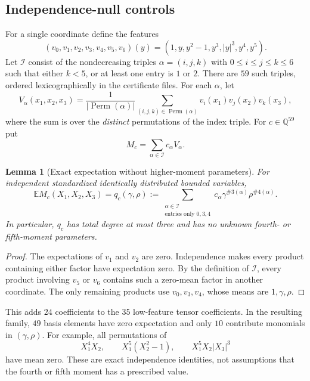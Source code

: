 \documentclass[11pt,a4paper]{article}
\numberwithin{equation}{section}
\newtheorem{lemma}[theorem]{Lemma}
\theoremstyle{definition}
\theoremstyle{remark}
\newcommand{\E}{\mathbb E}
\begin{document}
\subsection{Independence-null controls}
For a single coordinate define the features
\begin{equation}\label{n3:eq:features}
 (v_0,v_1,v_2,v_3,v_4,v_5,v_6)(y)
 =(1,y,y^2-1,y^3,|y|^3,y^4,y^5).
\end{equation}
Let $\mathcal I$ consist of the nondecreasing triples
$\alpha=(i,j,k)$ with $0\le i\le j\le k\le6$ such that either
$k<5$, or at least one entry is $1$ or $2$. There are $59$ such triples,
ordered lexicographically in the certificate files.
For each $\alpha$, let
\[
 V_\alpha(x_1,x_2,x_3)
 =\frac1{|\operatorname{Perm}(\alpha)|}
   \sum_{(i,j,k)\in\operatorname{Perm}(\alpha)}
        v_i(x_1)v_j(x_2)v_k(x_3),
\]
where the sum is over the \emph{distinct} permutations of the index triple.
For $c\in\mathbb Q^{59}$ put
\begin{equation}\label{n3:eq:majorant}
 M_c=\sum_{\alpha\in\mathcal I}c_\alpha V_\alpha.
\end{equation}

\begin{lemma}[Exact expectation without higher-moment parameters]\label{n3:lem:expect}
For independent standardized identically distributed bounded variables,
\begin{equation}\label{n3:eq:expect}
 \E M_c(X_1,X_2,X_3)=q_c(\gamma,\rho)
 :=\sum_{\substack{\alpha\in\mathcal I\\
                    \text{entries only }0,3,4}}
        c_\alpha\gamma^{\#3(\alpha)}\rho^{\#4(\alpha)}.
\end{equation}
In particular, $q_c$ has total degree at most three and has no unknown
fourth- or fifth-moment parameters.
\end{lemma}
\begin{proof}
The expectations of $v_1$ and $v_2$ are zero. Independence makes every
product containing either factor have expectation zero. By the definition
of $\mathcal I$, every product involving $v_5$ or $v_6$ contains such a
zero-mean factor in another coordinate. The only remaining products use
$v_0,v_3,v_4$, whose means are $1,\gamma,\rho$.
\end{proof}
This adds $24$ coefficients to the $35$ low-feature tensor coefficients.
In the resulting family, $49$ basis elements have zero expectation and
only $10$ contribute monomials in $(\gamma,\rho)$.
For example, all permutations of
\[
 X_1^4X_2,
 \qquad X_1^5(X_2^2-1),
 \qquad X_1^5X_2|X_3|^3
\]
have mean zero. These are exact independence identities, not assumptions
that the fourth or fifth moment has a prescribed value.
\end{document}
